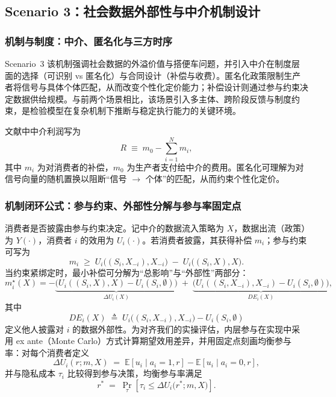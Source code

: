 \subsection{Scenario 3：社会数据外部性与中介机制设计}
\label{subsec:scenarioC}

\subsubsection{机制与制度：中介、匿名化与三方时序}
\label{subsubsec:C_game}

Scenario~3 该机制强调社会数据的外溢价值与搭便车问题，并引入中介在制度层面的选择（可识别 vs 匿名化）与合同设计（补偿与收费）。匿名化政策限制生产者将信号与具体个体匹配，从而改变个性化定价能力；补偿设计则通过参与约束决定数据供给规模。与前两个场景相比，该场景引入多主体、跨阶段反馈与制度约束，是检验模型在复杂机制下推断与稳定执行能力的关键环境。

文献中中介利润写为
\begin{equation}
R \;\equiv\; m_0 - \sum_{i=1}^N m_i,
\label{eq:C_profit_paper}
\end{equation}
其中 $m_i$ 为对消费者的补偿，$m_0$ 为生产者支付给中介的费用。匿名化可理解为对信号向量的随机置换以阻断“信号 $\rightarrow$ 个体”的匹配，从而约束个性化定价。

\subsubsection{机制闭环公式：参与约束、外部性分解与参与率固定点}
\label{subsubsec:C_formula}

消费者是否披露由参与约束决定。记中介的数据流入策略为 $X$，数据出流（政策）为 $Y(\cdot)$，消费者 $i$ 的效用为 $U_i(\cdot)$。若消费者披露，其获得补偿 $m_i$；参与约束可写为
\begin{equation}
m_i \;\ge\; U_i\big((S_i, X_{-i}), X_{-i}\big)\;-\;U_i\big((S_i, X), X\big).
\label{eq:C_PC}
\end{equation}
当约束紧绑定时，最小补偿可分解为“总影响”与“外部性”两部分：
\begin{equation}
m_i^\star(X)
= -\underbrace{\big(U_i((S_i,X),X)-U_i(S_i,\emptyset)\big)}_{\Delta U_i(X)}
\;+\;
\underbrace{\big(U_i((S_i,X_{-i}),X_{-i})-U_i(S_i,\emptyset)\big)}_{DE_i(X)},
\label{eq:C_decomp}
\end{equation}
其中
\begin{equation}
DE_i(X)\;\triangleq\; U_i\big((S_i,X_{-i}),X_{-i}\big)-U_i(S_i,\emptyset)
\label{eq:C_externality}
\end{equation}
定义他人披露对 $i$ 的数据外部性。为对齐我们的实操评估，内层参与在实现中采用 ex ante（Monte Carlo）方式计算期望效用差异，并用固定点刻画均衡参与率：对每个消费者定义
\begin{equation}
\Delta U_i(r;m,X)\;=\;\mathbb{E}[u_i\mid a_i=1,r] - \mathbb{E}[u_i\mid a_i=0,r],
\label{eq:C_deltaU}
\end{equation}
并与隐私成本 $\tau_i$ 比较得到参与决策，均衡参与率满足
\begin{equation}
  r^{\ast} \;=\; \Pr_{\tau}\!\left[\tau_i \le \Delta U_i\bigl(r^{\ast};m,X\bigr)\right].
  \label{eq:C_fp}
\end{equation}

